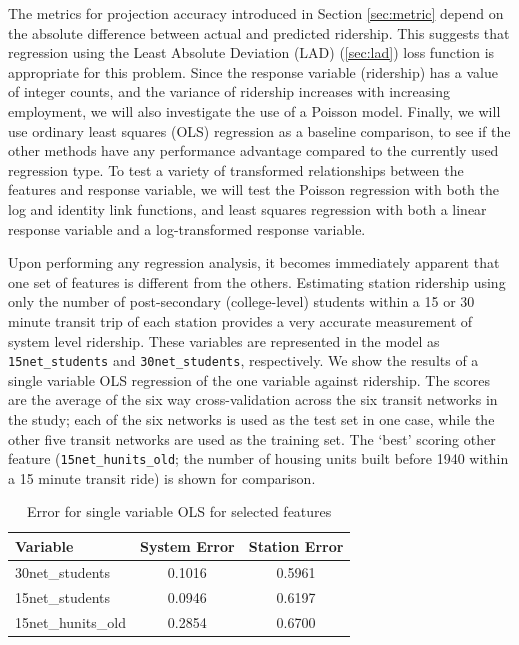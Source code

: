 \documentclass[11pt]{report}
\begin{document}
The metrics for projection accuracy introduced in Section \ref{sec:metric} depend on the absolute difference between actual and predicted ridership. This suggests that regression using the Least Absolute Deviation (LAD) (\ref{sec:lad}) loss function is appropriate for this problem. Since the response variable (ridership) has a value of integer counts, and the variance of ridership increases with increasing employment, we will also investigate the use of a Poisson model. Finally, we will use ordinary least squares (OLS) regression as a baseline comparison, to see if the other methods have any performance advantage compared to the currently used regression type. To test a variety of transformed relationships between the features and response variable, we will test the Poisson regression with both the log and identity link functions, and least squares regression with both a linear response variable and a log-transformed response variable.

Upon performing any regression analysis, it becomes immediately apparent that one set of features is different from the others. Estimating station ridership using only the number of post-secondary (college-level) students within a 15 or 30 minute transit trip of each station provides a very accurate measurement of system level ridership. These variables are represented in the model as \texttt{15net\_students} and \texttt{30net\_students}, respectively. We show the results of a single variable OLS regression of the one variable against ridership. The scores are the average of the six way cross-validation across the six transit networks in the study; each of the six networks is used as the test set in one case, while the other five transit networks are used as the training set. The `best' scoring other feature (\texttt{15net\_hunits\_old}; the number of housing units built before 1940 within a 15 minute transit ride) is shown for comparison.

\begin{table}[H]
\centering
\begin{tabular}{lcc}
\toprule Variable&System Error&Station Error\\
\midrule 30net\_students&0.1016&0.5961\\
15net\_students&0.0946&0.6197\\
15net\_hunits\_old&0.2854&0.6700\\ 
\end{tabular}
\caption{Error for single variable OLS for selected features}\label{tab:students}
\end{table}
\end{document}
